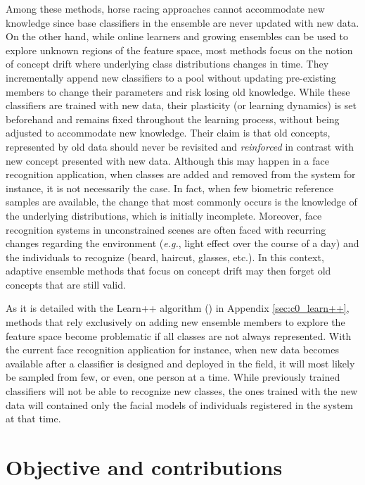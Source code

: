 Among these methods, horse racing approaches cannot accommodate new knowledge since base classifiers in the ensemble are never updated with new data.
On the other hand, while online learners and growing ensembles can be used to explore unknown regions of the feature space, most methods focus on the notion of concept drift where underlying class distributions changes in time.
They incrementally append new classifiers to a pool without updating pre-existing members to change their parameters and risk losing old knowledge.
While these classifiers are trained with new data, their plasticity (or learning dynamics) is set beforehand and remains fixed throughout the learning process, without being adjusted to accommodate new knowledge.
Their claim is that old concepts, represented by old data should never be revisited and \emph{reinforced} in contrast with new concept presented with new data.
Although this may happen in a face recognition application, when classes are added and removed from the system for instance, it is not necessarily the case.
In fact, when few biometric reference samples are available, the change that most commonly occurs is the knowledge of the underlying distributions, which is initially incomplete.
Moreover, face recognition systems in unconstrained scenes are often faced with recurring changes regarding the environment (\emph{e.g.}, light effect over the course of a day) and the individuals to recognize (beard, haircut, glasses, etc.).
In this context, adaptive ensemble methods that focus on concept drift may then forget old concepts that are still valid.

As it is detailed with the Learn++ algorithm (\cite{polikar01}) in Appendix \ref{sec:c0_learn++}, methods that rely exclusively on adding new ensemble members to explore the feature space become problematic if all classes are not always represented.
With the current face recognition application for instance, when new data becomes available after a classifier is designed and deployed in the field, it will most likely be sampled from few, or even, one person at a time. 
While previously trained classifiers will not be able to recognize new classes, the ones trained with the new data will contained only the facial models of individuals registered in the system at that time.

\section{Objective and contributions}

